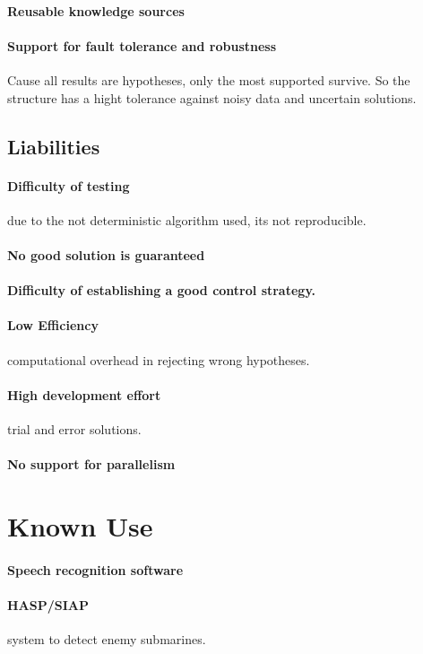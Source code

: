 \documentclass[a4paper,11pt,twocolumn]{report}
\begin{document}
    \paragraph{Reusable knowledge sources}
    \paragraph{Support for fault tolerance and robustness}
    Cause all results are hypotheses, only the most supported survive. So the
    structure has a hight tolerance against noisy data and uncertain solutions.
    \subsection{Liabilities}
    \paragraph{Difficulty of testing} due to the not deterministic algorithm
    used, its not reproducible.
    \paragraph{No good solution is guaranteed}
    \paragraph{Difficulty of establishing a good control strategy.}
    \paragraph{Low Efficiency} computational overhead in rejecting wrong
    hypotheses.
    \paragraph{High development effort} trial and error solutions.
    \paragraph{No support for parallelism}
    \section{Known Use}
    \paragraph{Speech recognition software}
    \paragraph{HASP/SIAP} system to detect enemy submarines.
\end{document}
